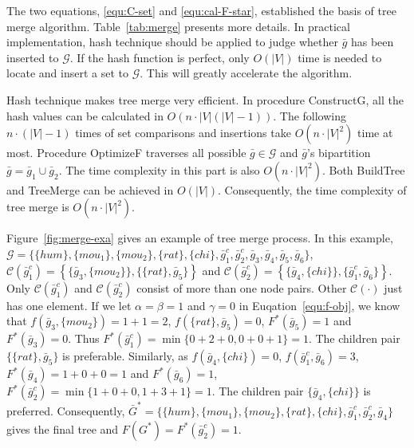 The two equations, \ref{equ:C-set} and \ref{equ:cal-F-star}, established the basis of tree merge algorithm. Table~\ref{tab:merge}
presents more details. In practical implementation, hash technique should be applied
to judge whether $\bar{g}$ has been inserted to $\mathcal{G}$. If the hash function
is perfect, only $O(|V|)$ time is needed to locate and insert a set to $\mathcal{G}$.
This will greatly accelerate the algorithm.

Hash technique makes tree merge very efficient. In procedure {\sc ConstructG}, all the hash values can be
calculated in $O(n\cdot|V|(|V|-1))$. The following $n\cdot(|V|-1)$ times of set comparisons and insertions
take $O(n\cdot|V|^2)$ time at most. Procedure
{\sc OptimizeF} traverses all possible $\bar{g}\in\mathcal{G}$ and $\bar{g}$'s bipartition
$\bar{g}=\bar{g}_1\cup\bar{g}_2$. The time complexity in this part is also $O(n\cdot|V|^2)$.
Both {\sc BuildTree} and {\sc TreeMerge} can be achieved in $O(|V|)$. Consequently, the time complexity
of tree merge is $O(n\cdot|V|^2)$.

Figure~\ref{fig:merge-exa} gives an example of tree merge process.
In this example, $\mathcal{G}=\{\{hum\},\{mou_1\},\{mou_2\},\{rat\},\{chi\},\bar{g}^c_1,
\bar{g}^c_2,\bar{g}_3,\bar{g}_4,\bar{g}_5,\bar{g}_6\}$,
$\mathcal{C}(\bar{g}^c_1)=\left\{\{\bar{g}_3,\{mou_2\}\},\{\{rat\},\bar{g}_5\}\right\}$
and $\mathcal{C}(\bar{g}^c_2)=\left\{\{\bar{g}_4,\{chi\}\},\{\bar{g}^c_1,\bar{g}_6\}\right\}$.
Only $\mathcal{C}(\bar{g}^c_1)$ and $\mathcal{C}(\bar{g}^c_2)$ consist of more than one node pairs. Other $\mathcal{C}(\cdot)$ just
has one element. If we let $\alpha=\beta=1$ and $\gamma=0$ in Euqation~\ref{equ:f-obj},
we know that $f(\bar{g}_3,\{mou_2\})=1+1=2$, $f(\{rat\},\bar{g}_5)=0$, $F^*(\bar{g}_5)=1$ and $F^*(\bar{g}_3)=0$. Thus
$F^*(\bar{g}^c_1)=\min\{0+2+0,0+0+1\}=1$. The children pair $\{\{rat\},\bar{g}_5\}$ is preferable.
Similarly, as $f(\bar{g}_4,\{chi\})=0$, $f(\bar{g}^c_1,\bar{g}_6)=3$, $F^*(\bar{g}_4)=1+0+0=1$
and $F^*(\bar{g}_6)=1$, $F^*(\bar{g}^c_2)=\min\{1+0+0,1+3+1\}=1$.
The children pair $\{\bar{g}_4,\{chi\}\}$ is preferred. Consequently,
$\bar{G}^*=\{\{hum\},\{mou_1\},\{mou_2\},\{rat\},\{chi\},\bar{g}_1^c,\bar{g}_2^c,\bar{g}_4\}$ gives the final tree
and $F(G^*)=F^*(\bar{g}^c_2)=1$.

